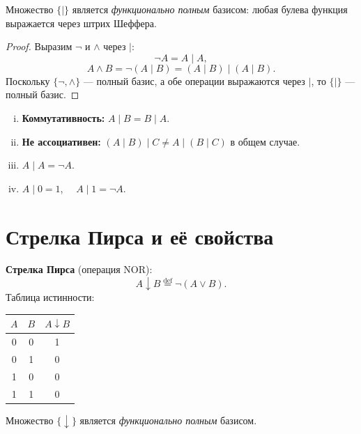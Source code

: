 \documentclass[12pt]{article}
\begin{document}
\begin{theorem}
Множество $\{|\}$ является \emph{функционально полным} базисом:
любая булева функция выражается через штрих Шеффера.
\end{theorem}

\begin{proof}
Выразим $\neg$ и $\wedge$ через $|$:
\[
\neg A = A \mid A,
\]
\[
A \wedge B = \neg(A \mid B) = (A \mid B) \mid (A \mid B).
\]
Поскольку $\{\neg, \wedge\}$ --- полный базис, а обе операции
выражаются через $|$, то $\{|\}$ --- полный базис.
\end{proof}

\begin{property}
\begin{enumerate}[(i)]
\item \textbf{Коммутативность:} $A \mid B = B \mid A$.
\item \textbf{Не ассоциативен:} $(A \mid B) \mid C \neq A \mid (B \mid C)$
      в общем случае.
\item $A \mid A = \neg A$.
\item $A \mid 0 = 1$, $\quad A \mid 1 = \neg A$.
\end{enumerate}
\end{property}

\section{Стрелка Пирса и её свойства}

\begin{definition}
\textbf{Стрелка Пирса} (операция NOR):
\[
A \downarrow B \stackrel{\mathrm{def}}{=} \neg(A \vee B).
\]
Таблица истинности:
\begin{center}
\begin{tabular}{|c|c|c|}
\hline
$A$ & $B$ & $A \downarrow B$ \\ \hline
0 & 0 & 1 \\
0 & 1 & 0 \\
1 & 0 & 0 \\
1 & 1 & 0 \\ \hline
\end{tabular}
\end{center}
\end{definition}

\begin{theorem}
Множество $\{\downarrow\}$ является \emph{функционально полным} базисом.
\end{theorem}
\end{document}
